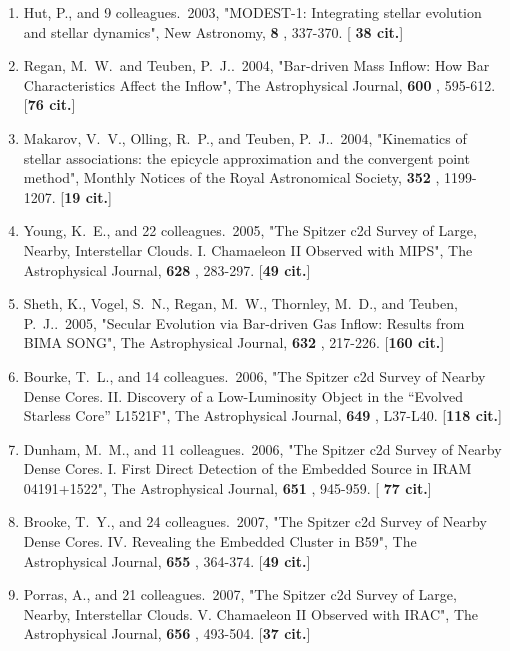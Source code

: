 \documentclass[11pt,letterpaper]{article}
\begin{document}
\begin{enumerate}[resume,label=\textbf{\arabic*}.]
\item  
Hut, P., and 9 colleagues.\  2003,  "MODEST-1: Integrating stellar 
evolution and stellar dynamics", New Astronomy,  {\bf 8} , 337-370.  [{\bf 
38 cit.}] 

\item  
Regan, M.~W.~and Teuben, P.~J..\  2004,  "Bar-driven Mass Inflow: How Bar 
Characteristics Affect the Inflow", The Astrophysical Journal,  {\bf 600} , 
595-612.  [{\bf 76 cit.}] 

\item  
Makarov, V.~V., Olling, R.~P., and Teuben, P.~J..\  2004,  "Kinematics of 
stellar associations: the epicycle approximation and the convergent point 
method", Monthly Notices of the Royal Astronomical Society,  {\bf 352} , 
1199-1207.  [{\bf 19 cit.}] 

\item  
Young, K.~E., and 22 colleagues.\  2005,  "The Spitzer c2d Survey of Large, 
Nearby, Interstellar Clouds. I. Chamaeleon II Observed with MIPS", The 
Astrophysical Journal,  {\bf 628} , 283-297.  [{\bf 49 cit.}] 

\item  
Sheth, K., Vogel, S.~N., Regan, M.~W., Thornley, M.~D., and Teuben, P.~J..\  
2005,  "Secular Evolution via Bar-driven Gas Inflow: Results from BIMA 
SONG", The Astrophysical Journal,  {\bf 632} , 217-226.  [{\bf 160 cit.}] 

\item  
Bourke, T.~L., and 14 colleagues.\  2006,  "The Spitzer c2d Survey of 
Nearby Dense Cores. II. Discovery of a Low-Luminosity Object in the 
``Evolved Starless Core'' L1521F", The Astrophysical Journal,  {\bf 649} , 
L37-L40.  [{\bf 118 cit.}] 

\item  
Dunham, M.~M., and 11 colleagues.\  2006,  "The Spitzer c2d Survey of 
Nearby Dense Cores. I. First Direct Detection of the Embedded Source in 
IRAM 04191+1522", The Astrophysical Journal,  {\bf 651} , 945-959.  [{\bf 
77 cit.}] 

\item  
Brooke, T.~Y., and 24 colleagues.\  2007,  "The Spitzer c2d Survey of 
Nearby Dense Cores. IV. Revealing the Embedded Cluster in B59", The 
Astrophysical Journal,  {\bf 655} , 364-374.  [{\bf 49 cit.}] 

\item  
Porras, A., and 21 colleagues.\  2007,  "The Spitzer c2d Survey of Large, 
Nearby, Interstellar Clouds. V. Chamaeleon II Observed with IRAC", The 
Astrophysical Journal,  {\bf 656} , 493-504.  [{\bf 37 cit.}] 


\end{enumerate}
\end{document}
